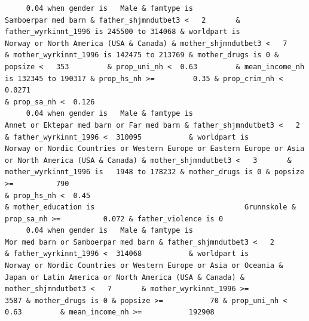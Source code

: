 \documentclass[
  letterpaper,
  DIV=11,
  numbers=noendperiod]{scrreprt}
\begin{document}
\begin{verbatim}
     0.04 when gender is   Male & famtype is                                              Samboerpar med barn & father_shjmndutbet3 <   2       & father_wyrkinnt_1996 is 245500 to 314068 & worldpart is                                                                                              Norway or North America (USA & Canada) & mother_shjmndutbet3 <   7       & mother_wyrkinnt_1996 is 142475 to 213769 & mother_drugs is 0 & popsize <   353         & prop_uni_nh <  0.63         & mean_income_nh is 132345 to 190317 & prop_hs_nh >=         0.35 & prop_crim_nh <  0.0271                                                                                                                  & prop_sa_nh <  0.126                                                                                                                                               
     0.04 when gender is   Male & famtype is                        Annet or Ektepar med barn or Far med barn & father_shjmndutbet3 <   2       & father_wyrkinnt_1996 <  310095           & worldpart is                              Norway or Nordic Countries or Western Europe or Eastern Europe or Asia or North America (USA & Canada) & mother_shjmndutbet3 <   3       & mother_wyrkinnt_1996 is   1948 to 178232 & mother_drugs is 0 & popsize >=          790                                                                    & prop_hs_nh <  0.45                                                                                & mother_education is                                   Grunnskole & prop_sa_nh >=          0.072 & father_violence is 0                                                                                                               
     0.04 when gender is   Male & famtype is                              Mor med barn or Samboerpar med barn & father_shjmndutbet3 <   2       & father_wyrkinnt_1996 <  314068           & worldpart is            Norway or Nordic Countries or Western Europe or Asia or Oceania & Japan or Latin America or North America (USA & Canada) & mother_shjmndutbet3 <   7       & mother_wyrkinnt_1996 >=             3587 & mother_drugs is 0 & popsize >=           70 & prop_uni_nh <  0.63         & mean_income_nh >=           192908                                                                                                                                                                                                                                                                                                                                            

\end{verbatim}
\end{document}
